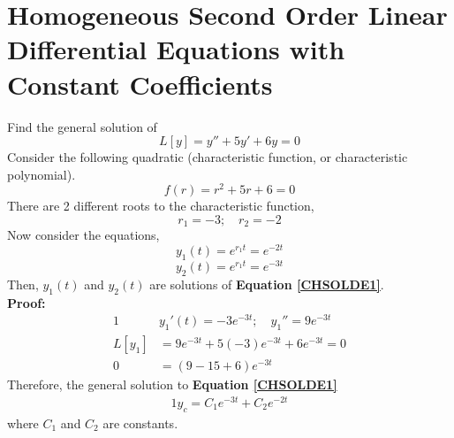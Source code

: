 \documentclass[twoside]{report}
\begin{document}
    \section{Homogeneous Second Order Linear Differential Equations with Constant Coefficients}
    \begin{example}[CHSOLDE]
        Find the general solution of
        \begin{equation}
            \label{CHSOLDE1}
            L[y] = y'' + 5y' + 6y = 0
        \end{equation}
        Consider the following quadratic (characteristic function, or characteristic polynomial).
        \begin{equation}
            f(r) = r^{2} + 5r + 6 = 0
        \end{equation}
        There are 2 different roots to the characteristic function,
        \begin{equation}
            r_{1} = -3;\quad r_{2} = -2
        \end{equation}
        Now consider the equations,
        \begin{equation}
            y_{1}(t) = e^{r_{1}t} = e^{-2t}
        \end{equation}
        \begin{equation}
            y_{2}(t) = e^{r_{1}t} = e^{-3t}
        \end{equation}
        Then, $y_{1}(t)$ and $y_{2}(t)$ are solutions of \textbf{Equation \ref{CHSOLDE1}}.\\
        \textbf{Proof:}
        \begin{alignat}{1}
            &y_{1}'(t) = -3e^{-3t};\quad y_{1}'' = 9e^{-3t}\\
            L[y_{1}] &= 9e^{-3t} + 5(-3)e^{-3t} + 6e^{-3t} = 0 \\
            0&= (9 - 15 + 6)e^{-3t}
        \end{alignat}
        Therefore, the general solution to \textbf{Equation \ref{CHSOLDE1}}
        \begin{alignat}{1}
            y_{c} = C_{1}e^{-3t} + C_{2}e^{-2t}
        \end{alignat}
        where $C_1$ and $C_2$ are constants.
    \end{example}
    \np
\end{document}

